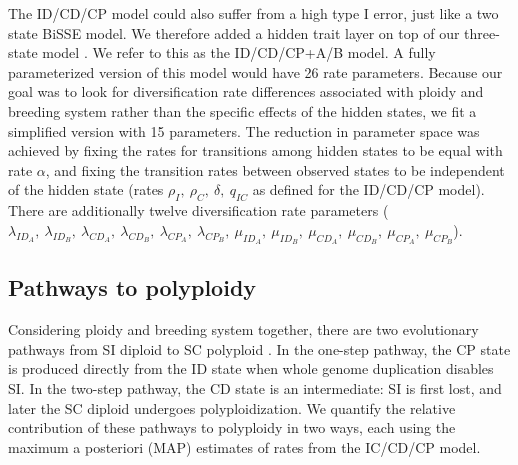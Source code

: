 The ID/CD/CP model could also suffer from a high type I error, just like a two state BiSSE model. 
We therefore added a hidden trait layer on top of our three-state model \citep[analogous to][]{caetano_2018,  huang_2018}.
We refer to this as the ID/CD/CP+A/B model.
A fully parameterized version of this model would have 26 rate parameters. 
Because our goal was to look for diversification rate differences associated with ploidy and breeding system rather than the specific effects of the hidden states, we fit a simplified version with 15 parameters.
The reduction in parameter space was achieved by fixing the rates for transitions among hidden states to be equal with rate $\alpha$, and fixing the transition rates between observed states to be independent of the hidden state (rates $\rho_I,\ \rho_C,\ \delta,\ q_{IC}$ as defined for the ID/CD/CP model).
There are additionally twelve diversification rate parameters ($\lambda_{ID_A},\ \lambda_{ID_B},\ \lambda_{CD_A},\ \lambda_{CD_B},\ \lambda_{CP_A},\ \lambda_{CP_B},\ \mu_{ID_A},\ \mu_{ID_B},\ \mu_{CD_A},\ \mu_{CD_B},\ \mu_{CP_A},\ \mu_{CP_B}$).

\subsection{Pathways to polyploidy}

Considering ploidy and breeding system together, there are two evolutionary pathways from SI diploid to SC polyploid \citep{brunet2001, robertson_2011}.
In the one-step pathway, the CP state is produced directly from the ID state when whole genome duplication disables SI.
In the two-step pathway, the CD state is an intermediate: SI is first lost, and later the SC diploid undergoes polyploidization.
We quantify the relative contribution of these pathways to polyploidy in two ways, each using the maximum a posteriori (MAP) estimates of rates from the IC/CD/CP model.


